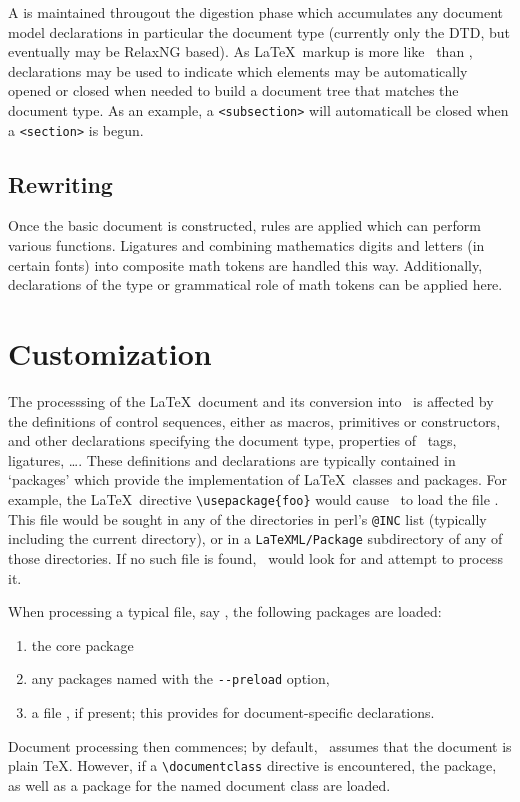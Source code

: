 \documentclass{book}
\begin{document}
A  is maintained througout the digestion phase which accumulates
any document model declarations in particular the document type (currently only
the DTD, but eventually may be RelaxNG based).  As \LaTeX\ markup is more
like \SGML\ than \XML, declarations may be used to indicate which elements may
be automatically opened or closed when needed to build a document tree that matches
the document type.  As an example, a \verb|<subsection>| will automaticall be closed
when a \verb|<section>| is begun.

\section{Rewriting}\label{architecture.rewriting}
Once the basic document is constructed,  rules are applied which can
perform various functions. Ligatures and combining mathematics digits and letters (in certain fonts)
into composite math tokens are handled this way.  Additionally, declarations
of the type or grammatical role of math tokens can be applied here.


\chapter{Customization}\label{customization}
The processsing of the \LaTeX\ document and its  conversion into \XML\ is affected
by the definitions of control sequences, either as macros, primitives or constructors, 
and other declarations specifying the document type, properties of \XML\ tags, ligatures, \ldots.
These definitions and declarations are typically contained in `packages' which provide
the implementation of \LaTeX\ classes and packages.  For example, the \LaTeX\ directive
\verb|\usepackage{foo}| would cause \LaTeXML\ to load the file .
This file would be sought in any of the directories in perl's \verb|@INC| list (typically
including the current directory), or in a \verb|LaTeXML/Package| subdirectory of any of 
those directories.  If no such file is found, \LaTeXML\ would look for  and
attempt to process it.

When processing a typical file, say , 
the following packages are loaded:
\begin{enumerate}
\item the core  package
\item any packages named with the \verb|--preload| option,
\item a file , if present;
      this provides for document-specific declarations.
\end{enumerate}
Document processing then commences; by default, \LaTeXML\ assumes that the document is plain \TeX.
However, if a \verb|\documentclass| directive is encountered, the  package, as well
as a package for the named document class are loaded.
\end{document}

